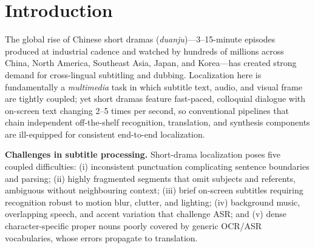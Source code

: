 \documentclass[mathematics,article,submit,xetex,moreauthors]{Definitions/mdpi}
\begin{document}
\maketitle

\section{Introduction}
\label{sec:introduction}
The global rise of Chinese short dramas (\textit{duanju})---3--15-minute episodes produced at industrial cadence and watched by hundreds of millions across China, North America, Southeast Asia, Japan, and Korea---has created strong demand for cross-lingual subtitling and dubbing.
Localization here is fundamentally a \emph{multimedia} task in which subtitle text, audio, and visual frame are tightly coupled; yet short dramas feature fast-paced, colloquial dialogue with on-screen text changing 2--5 times per second, so conventional pipelines that chain independent off-the-shelf recognition, translation, and synthesis components are ill-equipped for consistent end-to-end localization.

\textbf{Challenges in subtitle processing.}
Short-drama localization poses five coupled difficulties: (i) inconsistent punctuation complicating sentence boundaries and parsing; (ii) highly fragmented segments that omit subjects and referents, ambiguous without neighbouring context; (iii) brief on-screen subtitles requiring recognition robust to motion blur, clutter, and lighting; (iv) background music, overlapping speech, and accent variation that challenge ASR; and (v) dense character-specific proper nouns poorly covered by generic OCR/ASR vocabularies, whose errors propagate to translation.
\end{document}
